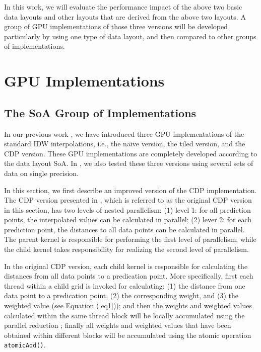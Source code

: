 In this work, we will evaluate the performance impact of the above two basic data layouts and other layouts that are derived from the above two layouts. A group of GPU implementations of those three versions will be developed particularly by using one type of data layout, and then compared to other groups of implementations. 



\section{GPU Implementations}
\label{sec:implement}

\subsection{The SoA Group of Implementations}
\label{sec:implement:soa}

In our previous work \cite{mei2014}, we have introduced three GPU implementations 
of the standard IDW interpolations, i.e., the na\"{\i}ve version, the tiled 
version, and the CDP version. These GPU implementations are completely 
developed according to the data layout SoA. In \cite{mei2014}, we also tested these 
three versions using several sets of data on single precision. 

In this section, we first describe an improved version of the CDP 
implementation. The CDP version presented in \cite{mei2014}, which is referred to 
as the original CDP version in this section, has two levels of nested 
parallelism: (1) level 1: for all prediction points, the interpolated values 
can be calculated in parallel; (2) lever 2: for each prediction point, the 
distances to all data points can be calculated in parallel. The parent 
kernel is responsible for performing the first level of parallelism, while 
the child kernel takes responsibility for realizing the second level of 
parallelism.

In the original CDP version, each child kernel is responsible for 
calculating the distances from all data points to a predication point. More 
specifically, first each thread within a child grid is invoked for 
calculating: (1) the distance from one data point to a predication point, 
(2) the corresponding weight, and (3) the weighted value (see Equation (\ref{eq1})); 
and then the weights and weighted values calculated within the same thread 
block will be locally accumulated using the parallel reduction \cite{harris2007}; 
finally all weights and weighted values that have been obtained within 
different blocks will be accumulated using the atomic operation \texttt{atomicAdd()}.

